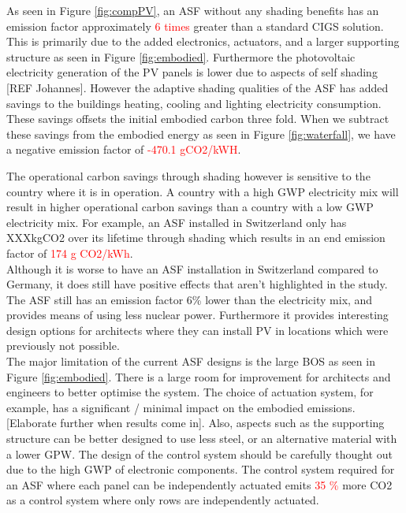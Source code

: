 


As seen in Figure \ref{fig:compPV}, an ASF without any shading benefits has an emission factor approximately \textcolor{red}{6 times } greater than a standard CIGS solution. This is primarily due to the added electronics, actuators, and a larger supporting structure as seen in Figure \ref{fig:embodied}. Furthermore the photovoltaic electricity generation of the PV panels is lower due to aspects of self shading [REF Johannes]. However the adaptive shading qualities of the ASF has added savings to the buildings heating, cooling and lighting electricity consumption. These savings offsets the initial embodied carbon three fold. When we subtract these savings from the embodied energy as seen in Figure \ref{fig:waterfall}, we have a negative emission factor of \textcolor{red}{-470.1 gCO2/kWH}. 

The operational carbon savings through shading however is sensitive to the country where it is in operation. A country with a high GWP electricity mix will result in higher operational carbon savings than a country with a low GWP electricity mix. For example, an ASF installed in Switzerland only has XXXkgCO2 over its lifetime through shading which results in an end emission factor of \textcolor{red}{174 g CO2/kWh}. \\



Although it is worse to have an ASF installation in Switzerland compared to Germany, it does still have positive effects that aren't highlighted in the study. The ASF still has an emission factor 6\% lower than the electricity mix, and provides means of using less nuclear power. Furthermore it provides interesting design options for architects where they can install PV in locations which were previously not possible.  \\

The major limitation of the current ASF designs is the large BOS as seen in Figure \ref{fig:embodied}. There is a large room for improvement for architects and engineers to better optimise the system. The choice of actuation system, for example, has a significant / minimal impact on the embodied emissions. [Elaborate further when results come in]. Also, aspects such as the supporting structure can be better designed to use less steel, or an alternative material with a lower GPW. The design of the control system should be carefully thought out due to the high GWP of electronic components. The control system required for an ASF where each panel can be independently actuated emits \textcolor{red}{35 \%} more CO2 as a control system where only rows are independently actuated. 





